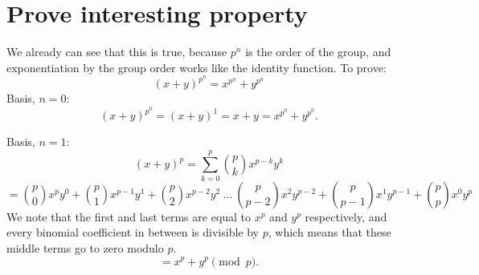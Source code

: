 \documentclass{article}
\begin{document}
\section{Prove interesting property}

We already can see that this is true, because $p^n$ is the order of the group, and exponentiation by the group order works like the identity function.
To prove:
\[ (x+y)^{p^n} = x^{p^n} + y^{p^n} \]
Basis, $n=0$:
\[ (x+y)^{p^0} = (x+y)^1 = x + y = x^{p^0} + y^{p^0}. \]

Basis, $n=1$:
\[ (x+y)^p = \sum_{k=0}^{p} {p \choose k} x^{p-k} y^{k}  \]
\[ = {p \choose 0} x^{p} y^{0} + {p \choose 1} x^{p-1} y^{1} + {p \choose 2} x^{p-2} y^{2}~ \dots~{p \choose p-2} x^{2} y^{p-2} + {p \choose p-1} x^{1} y^{p-1} + {p \choose p} x^{0} y^{p} \]
We note that the first and last terms are equal to $x^p$ and $y^p$ respectively, and every binomial coefficient in between is divisible by $p$, which means that these middle terms go to zero modulo $p$.
\[ = x^{p} + y^{p} \pmod p. \]

\end{document}
